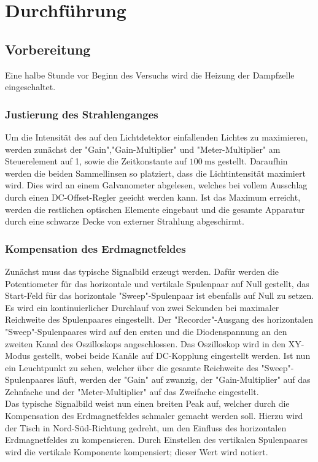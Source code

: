 \section{Durchführung}
\label{sec:durchführung}
\subsection{Vorbereitung}
Eine halbe Stunde vor Beginn des Versuchs wird die Heizung der Dampfzelle eingeschaltet.

\subsubsection{Justierung des Strahlenganges}
Um die Intensität des auf den Lichtdetektor einfallenden Lichtes zu maximieren, werden zunächst der "Gain","Gain-Multiplier" und "Meter-Multiplier" am Steuerelement auf 1, sowie die Zeitkonstante auf $\SI{100}{\milli\second}$ gestellt.
Daraufhin werden die beiden Sammellinsen so platziert, dass die Lichtintensität maximiert wird.
Dies wird an einem Galvanometer abgelesen, welches bei vollem Ausschlag durch einen DC-Offset-Regler geeicht werden kann.
Ist das Maximum erreicht, werden die restlichen optischen Elemente eingebaut und die gesamte Apparatur durch eine schwarze Decke von externer Strahlung abgeschirmt.

\subsubsection{Kompensation des Erdmagnetfeldes}
\label{sec:erdmagnetfeld}
Zunächst muss das typische Signalbild erzeugt werden.
Dafür werden die Potentiometer für das horizontale und vertikale Spulenpaar auf Null gestellt, das Start-Feld für das horizontale "Sweep"-Spulenpaar ist ebenfalls auf Null zu setzen.
Es wird ein kontinuierlicher Durchlauf von zwei Sekunden bei maximaler Reichweite des Spulenpaares eingestellt.
Der "Recorder"-Ausgang des horizontalen "Sweep"-Spulenpaares wird auf den ersten und die Diodenspannung an den zweiten Kanal des Oszilloskops angeschlossen.
Das Oszilloskop wird in den XY-Modus gestellt, wobei beide Kanäle auf DC-Kopplung eingestellt werden.
Ist nun ein Leuchtpunkt zu sehen, welcher über die gesamte Reichweite des "Sweep"-Spulenpaares läuft, werden der "Gain" auf zwanzig, der "Gain-Multiplier" auf das Zehnfache und der "Meter-Multiplier" auf das Zweifache eingestellt.\\
Das typische Signalbild weist nun einen breiten Peak auf, welcher durch die Kompensation des Erdmagnetfeldes schmaler gemacht werden soll.
Hierzu wird der Tisch in Nord-Süd-Richtung gedreht, um den Einfluss des horizontalen Erdmagnetfeldes zu kompensieren.
Durch Einstellen des vertikalen Spulenpaares wird die vertikale Komponente kompensiert; dieser Wert wird notiert.

